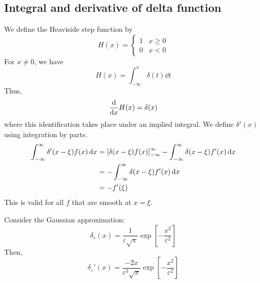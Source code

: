 \subsection{Integral and derivative of delta function}
We define the Heaviside step function by
\[
	H(x) = \begin{cases}
		1 & x \geq 0 \\
		0 & x < 0
	\end{cases}
\]
For \( x \neq 0 \), we have
\[
	H(x) = \int_{-\infty}^x \delta(t) \dd{t}
\]
Thus,
\[
	\dv{x} H(x) = \delta(x)
\]
where this identification takes place under an implied integral.
We define \( \delta'(x) \) using integration by parts.
\begin{align*}
	\int_{-\infty}^\infty \delta'(x-\xi) f(x) \dd{x} & = \qty[\delta(x-\xi) f(x)]_{-\infty}^\infty - \int_{-\infty}^\infty \delta(x-\xi) f'(x) \dd{x} \\
	                                                 & = - \int_{-\infty}^\infty \delta(x-\xi) f'(x) \dd{x}                                           \\
	                                                 & = - f'(\xi)
\end{align*}
This is valid for all \( f \) that are smooth at \( x = \xi \).
\begin{example}
	Consider the Gaussian approximation:
	\[
		\delta_\varepsilon(x) = \frac{1}{\varepsilon \sqrt{\pi}} \exp[-\frac{x^2}{\varepsilon^2}]
	\]
	Then,
	\[
		\delta_\varepsilon'(x) = \frac{-2x}{\varepsilon^3 \sqrt{\pi}} \exp[-\frac{x^2}{\varepsilon^2}]
	\]
\end{example}

